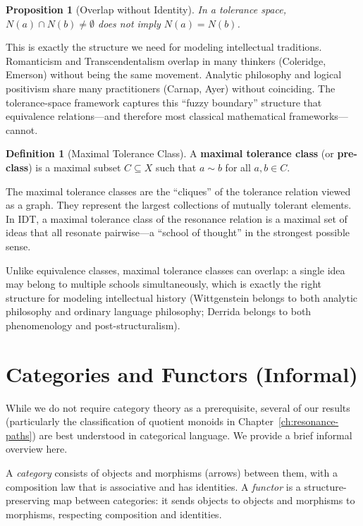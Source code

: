 \documentclass[11pt,openany]{book}
\theoremstyle{definition}
\newtheorem{definition}[axiom]{Definition}
\theoremstyle{plain}
\newtheorem{proposition}[axiom]{Proposition}
\theoremstyle{remark}
\begin{document}
\begin{proposition}[Overlap without Identity]
In a tolerance space, $N(a) \cap N(b) \neq \emptyset$ does not imply $N(a) = N(b)$.
\end{proposition}

This is exactly the structure we need for modeling intellectual traditions. Romanticism and Transcendentalism overlap in many thinkers (Coleridge, Emerson) without being the same movement. Analytic philosophy and logical positivism share many practitioners (Carnap, Ayer) without coinciding. The tolerance-space framework captures this ``fuzzy boundary'' structure that equivalence relations---and therefore most classical mathematical frameworks---cannot.

\begin{definition}[Maximal Tolerance Class]
A \textbf{maximal tolerance class} (or \textbf{pre-class}) is a maximal subset $C \subseteq X$ such that $a \sim b$ for all $a, b \in C$.
\end{definition}

The maximal tolerance classes are the ``cliques'' of the tolerance relation viewed as a graph. They represent the largest collections of mutually tolerant elements. In IDT, a maximal tolerance class of the resonance relation is a maximal set of ideas that all resonate pairwise---a ``school of thought'' in the strongest possible sense.

Unlike equivalence classes, maximal tolerance classes can overlap: a single idea may belong to multiple schools simultaneously, which is exactly the right structure for modeling intellectual history (Wittgenstein belongs to both analytic philosophy and ordinary language philosophy; Derrida belongs to both phenomenology and post-structuralism).

\section{Categories and Functors (Informal)}

While we do not require category theory as a prerequisite, several of our results (particularly the classification of quotient monoids in Chapter~\ref{ch:resonance-paths}) are best understood in categorical language. We provide a brief informal overview here.

A \emph{category} consists of objects and morphisms (arrows) between them, with a composition law that is associative and has identities. A \emph{functor} is a structure-preserving map between categories: it sends objects to objects and morphisms to morphisms, respecting composition and identities.
\end{document}
